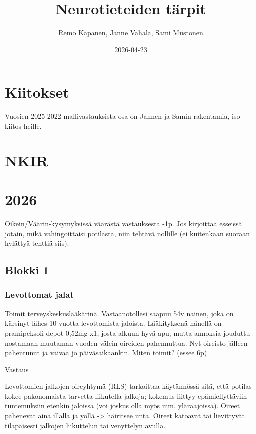 \documentclass[
]{book}
\title{Neurotieteiden tärpit}
\author{Remo Kapanen, Janne Vahala, Sami Mustonen}
\date{2026-04-23}
\begin{document}
\maketitle

{
\setcounter{tocdepth}{1}
\tableofcontents
}
\chapter{Kiitokset}\label{kiitokset}

Vuosien 2025-2022 mallivastauksista osa on Jannen ja Samin rakentamia, iso kiitos heille.

\chapter{NKIR}\label{nkir}

\chapter{2026}\label{section}

Oikein/Väärin-kysymyksissä väärästä vastauksesta -1p. Jos kirjoittaa esseissä jotain, mikä vahingoittaisi potilasta, niin tehtävä nollille (ei kuitenkaan suoraan hylättyä tenttiä siis).

\section{Blokki 1}\label{blokki-1}

\subsection{Levottomat jalat}\label{levottomat-jalat}

Toimit terveyskeskuslääkärinä. Vastaanotollesi saapuu 54v nainen, joka on kärsinyt lähes 10 vuotta levottomista jaloista. Lääkityksenä hänellä on pramipeksoli depot 0,52mg x1, josta alkuun hyvä apu, mutta annoksia jouduttu nostamaan muutaman vuoden välein oireiden pahennuttua. Nyt oireisto jälleen pahentunut ja vaivaa jo päiväsaikaankin. Miten toimit? (essee 6p)

Vastaus

Levottomien jalkojen oireyhtymä (RLS) tarkoittaa käytännössä sitä, että potilas kokee pakonomaista tarvetta liikutella jalkoja; kokemus liittyy epämiellyttäviin tuntemuksiin etenkin jaloissa (voi joskus olla myös mm. yläraajoissa). Oireet pahenevat aina illalla ja yöllä -\textgreater{} häiritsee unta. Oireet katoavat tai lievittyvät tilapäisesti jalkojen liikuttelun tai venyttelyn avulla.
\end{document}
